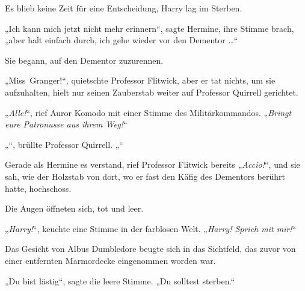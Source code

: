 Es blieb keine Zeit für eine Entscheidung, Harry lag im Sterben.

„Ich kann mich jetzt nicht mehr erinnern“, sagte Hermine, ihre Stimme brach, „aber halt einfach durch, ich gehe wieder vor den Dementor …“

Sie begann, auf den Dementor zuzurennen.

„Miss~Granger!“, quietschte Professor Flitwick, aber er tat nichts, um sie aufzuhalten, hielt nur seinen Zauberstab weiter auf Professor Quirrell gerichtet.

„\emph{Alle!}“, rief Auror Komodo mit einer Stimme des Militärkommandos.
„\emph{Bringt eure Patronusse aus ihrem Weg!}“

„“, brüllte Professor Quirrell.
„“

Gerade als Hermine es verstand, rief Professor Flitwick bereits „\emph{Accio!}“, und sie sah, wie der Holzstab von dort, wo er fast den Käfig des Dementors berührt hatte, hochschoss.

\later

Die Augen öffneten sich, tot und leer.

„\emph{Harry!}“, keuchte eine Stimme in der farblosen Welt.
„\emph{Harry! Sprich mit mir!}“

Das Gesicht von Albus Dumbledore beugte sich in das Sichtfeld, das zuvor von einer entfernten Marmordecke eingenommen worden war.

„Du bist lästig“, sagte die leere Stimme.
„Du solltest sterben.“